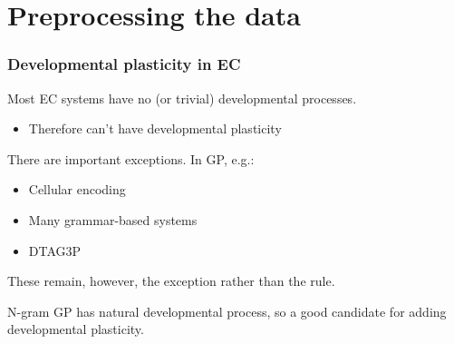 \documentclass{beamer}
\newcommand{\linespace}{\vskip 0.25cm}
\begin{document}
%	
%				



\section[Preprocessing the data]{Preprocessing the data}
\begin{frame}
	\frametitle{Developmental plasticity in EC}
	
	Most EC systems have no (or trivial) developmental processes.
	\begin{itemize}
		\item Therefore can't have developmental plasticity
	\end{itemize}
	
	\linespace
	
	There are important exceptions.  In GP, e.g.:
	\begin{itemize}
		\item Cellular encoding
		\item Many grammar-based systems
		\item DTAG3P
	\end{itemize}
	
	\linespace 
	
	These remain, however, the exception rather than the rule.
	
	\linespace
	
	N-gram GP has natural developmental process, so a good candidate for adding developmental plasticity.
\end{frame}
\end{document}
